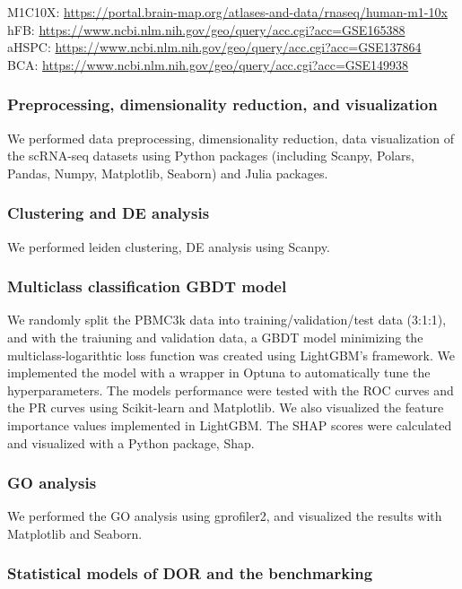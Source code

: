 \documentclass{article}
\begin{document}
M1C10X: \url{https://portal.brain-map.org/atlases-and-data/rnaseq/human-m1-10x}\\
hFB: \url{https://www.ncbi.nlm.nih.gov/geo/query/acc.cgi?acc=GSE165388}\\
aHSPC: \url{https://www.ncbi.nlm.nih.gov/geo/query/acc.cgi?acc=GSE137864}\\
BCA: \url{https://www.ncbi.nlm.nih.gov/geo/query/acc.cgi?acc=GSE149938}\\
\cite{xie2021single}

\subsubsection*{Preprocessing, dimensionality reduction, and visualization}
We performed data preprocessing, dimensionality reduction, data visualization
of the scRNA-seq datasets using Python packages (including Scanpy\cite{scanpy}, Polars,
Pandas\cite{pandas}, Numpy, Matplotlib\cite{matplotlib}, Seaborn\cite{seaborn}) and Julia packages.

\subsubsection*{Clustering and DE analysis}
We performed leiden clustering, DE analysis using Scanpy.

\subsubsection*{Multiclass classification GBDT model}
We randomly split the PBMC3k data into training/validation/test data (3:1:1), and with the traiuning and validation 
data, a GBDT model minimizing the multiclass-logarithtic loss function was created using LightGBM's 
framework. We implemented the model with a wrapper in Optuna to automatically tune the hyperparameters. The 
models performance were tested with the ROC curves and the PR curves using Scikit-learn and Matplotlib. We 
also visualized the feature importance values implemented in LightGBM. The SHAP scores were calculated and visualized 
with a Python package, Shap\cite{shap,shap_treeexplainer}.

\subsubsection*{GO analysis}
We performed the GO analysis using gprofiler2\cite{gprofiler2}, and visualized the results with Matplotlib and Seaborn.

\subsubsection*{Statistical models of DOR and the benchmarking}
\end{document}
